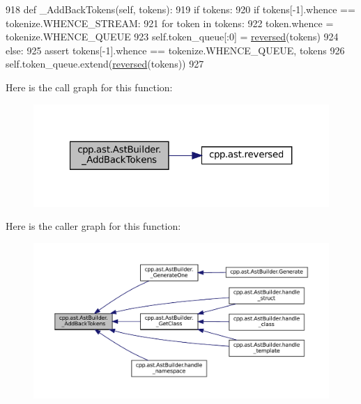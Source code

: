 \begin{DoxyCode}
918     \textcolor{keyword}{def }\_AddBackTokens(self, tokens):
919         \textcolor{keywordflow}{if} tokens:
920             \textcolor{keywordflow}{if} tokens[-1].whence == tokenize.WHENCE\_STREAM:
921                 \textcolor{keywordflow}{for} token \textcolor{keywordflow}{in} tokens:
922                     token.whence = tokenize.WHENCE\_QUEUE
923                 self.token\_queue[:0] = \hyperlink{namespacecpp_1_1ast_a0b1c00fd4aaa476b10de6b3a2550f39f}{reversed}(tokens)
924             \textcolor{keywordflow}{else}:
925                 \textcolor{keyword}{assert} tokens[-1].whence == tokenize.WHENCE\_QUEUE, tokens
926                 self.token\_queue.extend(\hyperlink{namespacecpp_1_1ast_a0b1c00fd4aaa476b10de6b3a2550f39f}{reversed}(tokens))
927 
\end{DoxyCode}
Here is the call graph for this function\+:
\nopagebreak
\begin{figure}[H]
\begin{center}
\leavevmode
\includegraphics[width=321pt]{classcpp_1_1ast_1_1AstBuilder_aa148966c6578f4560a4164db33df0fcf_cgraph}
\end{center}
\end{figure}
Here is the caller graph for this function\+:
\nopagebreak
\begin{figure}[H]
\begin{center}
\leavevmode
\includegraphics[width=350pt]{classcpp_1_1ast_1_1AstBuilder_aa148966c6578f4560a4164db33df0fcf_icgraph}
\end{center}
\end{figure}
\mbox{\label{classcpp_1_1ast_1_1AstBuilder_aed483f6f87068092d41c7b612553b330}} 
